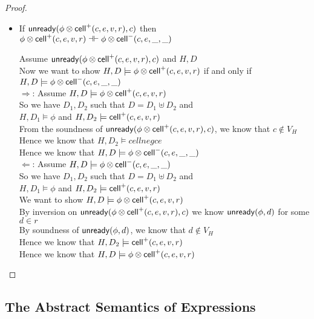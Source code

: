 \begin{proof}
\begin{itemize}
\item If $\mathsf{unready}({\phi \otimes \mathsf{cell}^{+}({c}, {e}, {v}, {r})}, {c})$ then $\phi \otimes \mathsf{cell}^{+}({c}, {e}, {v}, {r}) \dashv\vdash \phi \otimes \mathsf{cell}^{-}({c}, {e}, {\_}, {\_})$
\begin{tabbedproof}
\oo Assume $\mathsf{unready}({\phi \otimes \mathsf{cell}^{+}({c}, {e}, {v}, {r})}, {c})$  and $H, D$ \\
\oo Now we want to show $H, D \models \phi \otimes \mathsf{cell}^{+}({c}, {e}, {v}, {r})$ if and only if \\
\ox $H, D \models \phi \otimes \mathsf{cell}^{-}({c}, {e}, {\_}, {\_})$ \\
\oo $\Rightarrow$: Assume $H, D \models \phi \otimes \mathsf{cell}^{+}({c}, {e}, {v}, {r})$ \\
\ooo So we have $D_1, D_2$ such that $D = D_1 \uplus D_2$ and \\
\oox $H, D_1 \models \phi$ and $H, D_2 \models \mathsf{cell}^{+}({c}, {e}, {v}, {r})$ \\
\ooo From the soundness of $\mathsf{unready}({\phi \otimes \mathsf{cell}^{+}({c}, {e}, {v}, {r})}, {c})$, we know that $c \not \in V_H$ \\
\ooo Hence we know that $H, D_2 \models cellneg{c}{e}$ \\
\ooo Hence we know that $H, D \models \phi \otimes \mathsf{cell}^{-}({c}, {e}, {\_}, {\_})$ \\
\oo $\Leftarrow$: Assume $H, D \models \phi \otimes \mathsf{cell}^{-}({c}, {e}, {\_}, {\_})$ \\
\ooo So we have $D_1, D_2$ such that $D = D_1 \uplus D_2$ and \\
\oox $H, D_1 \models \phi$ and $H, D_2 \models \mathsf{cell}^{+}({c}, {e}, {v}, {r})$ \\
\ooo We want to show $H, D \models \phi \otimes \mathsf{cell}^{+}({c}, {e}, {v}, {r})$ \\
\ooo By inversion on $\mathsf{unready}({\phi \otimes \mathsf{cell}^{+}({c}, {e}, {v}, {r})}, {c})$ we know $\mathsf{unready}({\phi}, {d})$ for some $d \in r$ \\
\ooo By soundness of $\mathsf{unready}({\phi}, {d})$, we know that $d \not\in V_H$ \\
\ooo Hence we know that $H, D_2 \models \mathsf{cell}^{+}({c}, {e}, {v}, {r})$ \\
\ooo Hence we know that $H, D \models \phi \otimes \mathsf{cell}^{+}({c}, {e}, {v}, {r})$ \\
\end{tabbedproof}
\end{itemize}
\end{proof}



\subsection{The Abstract Semantics of Expressions}

